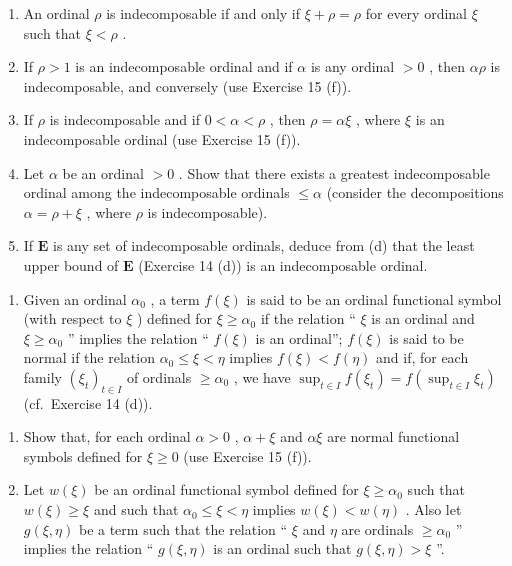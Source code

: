 \begin{enumerate}
\def\labelenumi{(\alph{enumi})}
\item
  An ordinal \(\rho\) is indecomposable if and only if \(\xi + \rho = \rho\) for every ordinal \(\xi\) such that \(\xi < \rho\) .
\item
  If \(\rho > 1\) is an indecomposable ordinal and if \(\alpha\) is any ordinal \(>0\) , then \(\alpha\rho\) is indecomposable, and conversely (use Exercise 15 (f)).
\item
  If \(\rho\) is indecomposable and if \(0 < \alpha < \rho\) , then \(\rho = \alpha\xi\) , where \(\xi\) is an indecomposable ordinal (use Exercise 15 (f)).
\item
  Let \(\alpha\) be an ordinal \(>0\) . Show that there exists a greatest indecomposable ordinal among the indecomposable ordinals \(\leqslant \alpha\) (consider the decompositions \(\alpha = \rho + \xi\) , where \(\rho\) is indecomposable).
\item
  If \(\mathbf{E}\) is any set of indecomposable ordinals, deduce from (d) that the least upper bound of \(\mathbf{E}\) (Exercise 14 (d)) is an indecomposable ordinal.
\end{enumerate}

\begin{enumerate}
\def\labelenumi{\arabic{enumi}.}
\setcounter{enumi}{16}
\tightlist
\item
  Given an ordinal \(\alpha_0\) , a term \(f(\xi)\) is said to be an ordinal functional symbol (with respect to \(\xi\) ) defined for \(\xi \geqslant \alpha_0\) if the relation `` \(\xi\) is an ordinal and \(\xi \geqslant \alpha_0\) '' implies the relation `` \(f(\xi)\) is an ordinal''; \(f(\xi)\) is said to be normal if the relation \(\alpha_0 \leqslant \xi < \eta\) implies \(f(\xi) < f(\eta)\) and if, for each family \((\xi_t)_{t \in I}\) of ordinals \(\geqslant \alpha_0\) , we have \(\sup_{t \in I} f(\xi_t) = f(\sup_{t \in I} \xi_t)\) (cf.~Exercise 14 (d)).
\end{enumerate}

\begin{enumerate}
\def\labelenumi{(\alph{enumi})}
\item
  Show that, for each ordinal \(\alpha > 0\) , \(\alpha + \xi\) and \(\alpha\xi\) are normal functional symbols defined for \(\xi \geqslant 0\) (use Exercise 15 (f)).
\item
  Let \(w(\xi)\) be an ordinal functional symbol defined for \(\xi \geqslant \alpha_0\) such that \(w(\xi) \geqslant \xi\) and such that \(\alpha_0 \leqslant \xi < \eta\) implies \(w(\xi) < w(\eta)\) . Also let \(g(\xi, \eta)\) be a term such that the relation `` \(\xi\) and \(\eta\) are ordinals \(\geqslant \alpha_0\) '' implies the relation `` \(g(\xi, \eta)\) is an ordinal such that \(g(\xi, \eta) > \xi\) ''.
\end{enumerate}

